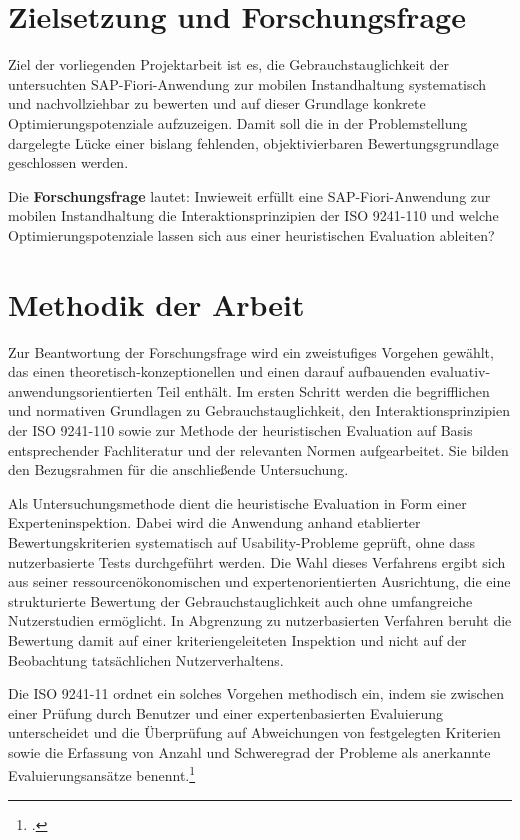 \section{Zielsetzung und Forschungsfrage}
\label{section:zielsetzung}
Ziel der vorliegenden Projektarbeit ist es, die Gebrauchstauglichkeit der untersuchten SAP-Fiori-Anwendung zur mobilen Instandhaltung 
systematisch und nachvollziehbar zu bewerten und auf dieser Grundlage konkrete Optimierungspotenziale aufzuzeigen. 
Damit soll die in der Problemstellung dargelegte Lücke einer bislang fehlenden, objektivierbaren Bewertungsgrundlage geschlossen werden.

Die \textbf{Forschungsfrage} lautet: Inwieweit erfüllt eine SAP-Fiori-Anwendung zur mobilen Instandhaltung die Interaktionsprinzipien der ISO 9241-110 
und welche Optimierungspotenziale lassen sich aus einer heuristischen Evaluation ableiten?


\section{Methodik der Arbeit}
\label{section:methodik}

Zur Beantwortung der Forschungsfrage wird ein zweistufiges Vorgehen gewählt, das einen theoretisch-konzeptionellen und einen darauf 
aufbauenden evaluativ-anwendungsorientierten Teil enthält. Im ersten Schritt werden die begrifflichen und normativen Grundlagen zu 
Gebrauchstauglichkeit, den Interaktionsprinzipien der ISO 9241-110 sowie zur Methode der heuristischen Evaluation auf Basis 
entsprechender Fachliteratur und der relevanten Normen aufgearbeitet. Sie bilden den Bezugsrahmen für die anschließende Untersuchung.

Als Untersuchungsmethode dient die heuristische Evaluation in Form einer Experteninspektion. Dabei wird die Anwendung anhand etablierter
Bewertungskriterien systematisch auf Usability-Probleme geprüft, ohne dass nutzerbasierte Tests durchgeführt werden. Die Wahl dieses Verfahrens 
ergibt sich aus seiner ressourcenökonomischen und expertenorientierten Ausrichtung, die eine strukturierte Bewertung der Gebrauchstauglichkeit 
auch ohne umfangreiche Nutzerstudien ermöglicht. In Abgrenzung zu nutzerbasierten Verfahren beruht die Bewertung damit auf einer 
kriteriengeleiteten Inspektion und nicht auf der Beobachtung tatsächlichen Nutzerverhaltens.

Die ISO 9241-11 ordnet ein solches Vorgehen methodisch ein, indem sie zwischen einer Prüfung durch Benutzer und einer expertenbasierten Evaluierung
unterscheidet und die Überprüfung auf Abweichungen von festgelegten Kriterien sowie die Erfassung von Anzahl und Schweregrad der Probleme 
als anerkannte Evaluierungsansätze benennt.\footcite[Vgl.][Abschnitt~B.1]{DIN_ISO_9241-11:2018}

